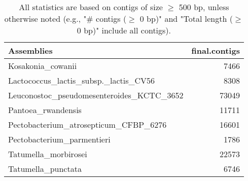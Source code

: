\documentclass[12pt,a4paper]{article}
\begin{document}
\begin{table}[ht]
\begin{center}
\caption{All statistics are based on contigs of size $\geq$ 500 bp, unless otherwise noted (e.g., "\# contigs ($\geq$ 0 bp)" and "Total length ($\geq$ 0 bp)" include all contigs).}
\begin{tabular}{|l*{1}{|r}|}
\hline
Assemblies & final.contigs \\ \hline
Kosakonia\_cowanii & 7466 \\ \hline
Lactococcus\_lactis\_subsp.\_lactis\_CV56 & 8308 \\ \hline
Leuconostoc\_pseudomesenteroides\_KCTC\_3652 & 73049 \\ \hline
Pantoea\_rwandensis & 11711 \\ \hline
Pectobacterium\_atrosepticum\_CFBP\_6276 & 16601 \\ \hline
Pectobacterium\_parmentieri & 1786 \\ \hline
Tatumella\_morbirosei & 22573 \\ \hline
Tatumella\_punctata & 6746 \\ \hline
\end{tabular}
\end{center}
\end{table}
\end{document}

